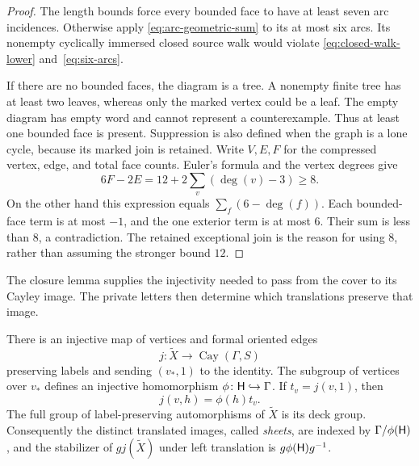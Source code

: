 \begin{proof}
The length bounds force every bounded face to have at least seven arc
incidences.  Otherwise apply
\eqref{eq:arc-geometric-sum} to its at most six arcs.  Its nonempty
cyclically immersed closed source walk would violate
\eqref{eq:closed-walk-lower} and~\eqref{eq:six-arcs}.

If there are no bounded faces, the diagram is a tree.  A nonempty finite
tree has at least two leaves, whereas only the marked vertex could be
a leaf.  The empty diagram has empty word and cannot represent a
counterexample.  Thus at least one bounded face is present.  Suppression
is also defined when the graph is a lone cycle, because its marked join
is retained.  Write $V,E,F$ for the compressed vertex, edge, and total
face counts.  Euler's formula and the vertex degrees give
\begin{equation}\label{eq:exceptional-curvature}
 6F-2E
 =12+2\sum_v(\deg(v)-3)\ge8.
\end{equation}
On the other hand this expression equals
$\sum_f(6-\deg(f))$.  Each bounded-face term is at most $-1$, and the
one exterior term is at most $6$.  Their sum is less than $8$, a
contradiction.  The retained exceptional join is the reason for using
$8$, rather than assuming the stronger bound $12$.
\end{proof}

The closure lemma supplies the injectivity needed to pass from the cover
to its Cayley image.  The private letters then determine which translations
preserve that image.

\begin{proposition}\label{prop:graphical-realization}
There is an injective map of vertices and formal oriented edges
\[
 j\colon\widetilde X\longrightarrow\operatorname{Cay}(\Gamma,S)
\]
preserving labels and sending $(v_*,1)$ to the identity.  The subgroup
of vertices over $v_*$ defines an injective homomorphism
$\phi\colon\mathsf H\hookrightarrow\Gamma$.  If
$t_v=j(v,1)$, then
\begin{equation}\label{eq:deck-transport}
 j(v,h)=\phi(h)t_v.
\end{equation}
The full group of label-preserving automorphisms of $\widetilde X$ is its
deck group.  Consequently the distinct translated images, called
\emph{sheets}, are indexed by $\Gamma/\phi(\mathsf H)$, and the stabilizer of
$g j(\widetilde X)$ under left translation is
$g\phi(\mathsf H)g^{-1}$.
\end{proposition}

